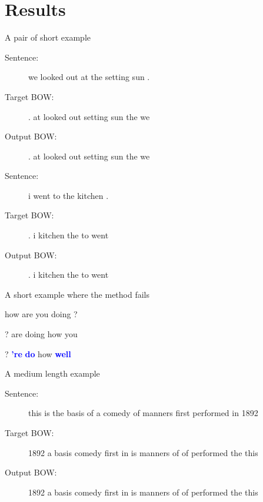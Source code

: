 \documentclass[]{beamer}
\begin{document}
\section{Results}

\begin{frame}{A pair of short example}
	\vfill
	\begin{description}
		\item[Sentence:] we looked out at the setting sun .
		\item[Target BOW:]  . at looked out setting sun the we
		\item[Output BOW:]  . at looked out setting sun the we 
	\end{description}
	\vfill
	\vfill
	\begin{description}
		\item[Sentence:] i went to the kitchen .
		\item[Target BOW:] . i kitchen the to went
		\item[Output BOW:] . i kitchen the to went   
	\end{description}
	\vfill
\end{frame}

\begin{frame}[fragile]{A short example where the method fails}
	
	\begin{description}
		\let\oldtextbf\textbf
		\renewcommand{\emph}[1]{\textcolor{blue}{\oldtextbf{#1}}}
		\renewcommand{\textbf}[1]{\textcolor{red}{\cancel{#1}}}
		\item[Sentence:] how are you doing ?
		\item[Target BOW:] ? are doing how you
		\item[Output BOW:] ? \emph{'re} \textbf{are} \emph{do} \textbf{doing} how  \emph{well} \textbf{you}
	\end{description}
\end{frame}


\begin{frame}{A medium length example}
	\begin{description}
		\item[Sentence:] this is the basis of a comedy of manners first performed in 1892
		\item[Target BOW:] 1892 a   basis   comedy  first   in  is  manners of  of  performed   the this
		\item[Output BOW:] 1892 a   basis   comedy  first   in  is  manners of  of  performed   the this        
	\end{description}
\end{frame}
\end{document}
